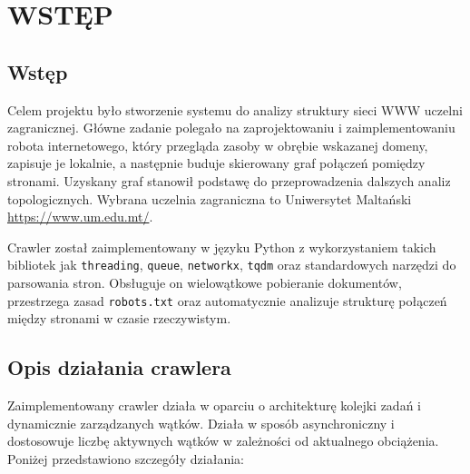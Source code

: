 \chapter{WSTĘP}
\section{Wstęp}

Celem projektu było stworzenie systemu do analizy struktury sieci WWW uczelni zagranicznej. Główne zadanie polegało na zaprojektowaniu i zaimplementowaniu robota internetowego, który przegląda zasoby w obrębie wskazanej domeny, zapisuje je lokalnie, a następnie buduje skierowany graf połączeń pomiędzy stronami. Uzyskany graf stanowił podstawę do przeprowadzenia dalszych analiz topologicznych. Wybrana uczelnia zagraniczna to Uniwersytet Maltański \url{https://www.um.edu.mt/}.

Crawler został zaimplementowany w języku Python z wykorzystaniem takich bibliotek jak \texttt{threading}, \texttt{queue}, \texttt{networkx}, \texttt{tqdm} oraz standardowych narzędzi do parsowania stron. Obsługuje on wielowątkowe pobieranie dokumentów, przestrzega zasad \texttt{robots.txt} oraz automatycznie analizuje strukturę połączeń między stronami w czasie rzeczywistym.

\section{Opis działania crawlera}

Zaimplementowany crawler działa w oparciu o architekturę kolejki zadań i dynamicznie zarządzanych wątków. Działa w sposób asynchroniczny i dostosowuje liczbę aktywnych wątków w zależności od aktualnego obciążenia. Poniżej przedstawiono szczegóły działania:

